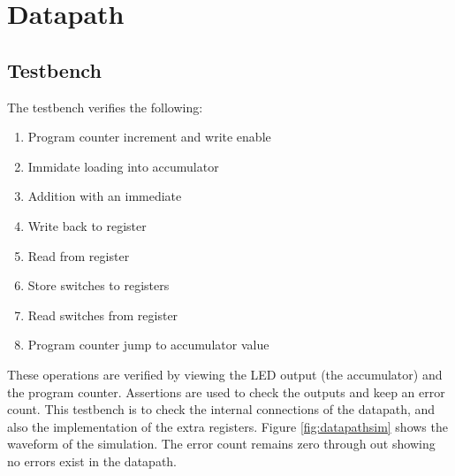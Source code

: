 


\section{Datapath}\label{sect:datapath}
\subsection{Testbench}
The testbench verifies the following: %
\begin{enumerate}
\item Program counter increment and write enable
\item Immidate loading into accumulator
\item Addition with an immediate
\item Write back to register
\item Read from register
\item Store switches to registers
\item Read switches from register
\item Program counter jump to accumulator value
\end{enumerate}

These operations are verified by viewing the LED output (the accumulator) and the program counter.
Assertions are used to check the outputs and keep an error count. 
This testbench is to check the internal connections of the datapath, and also the implementation of the extra registers.
Figure \ref{fig:datapathsim} shows the waveform of the simulation. 
The error count remains zero through out showing no errors exist in the datapath.

